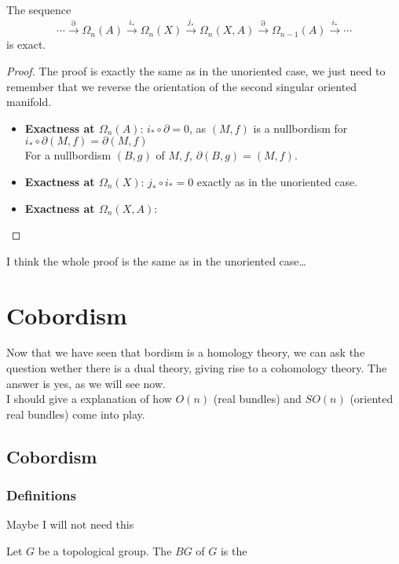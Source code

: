 \documentclass[a4paper,11pt]{article}
\begin{document}
\begin{lemma}
    The sequence
    \[\cdots\xrightarrow{\partial}\Omega_n(A)\xrightarrow{i_\ast}\Omega_n(X)\xrightarrow{j_\ast}\Omega_n(X,A)\xrightarrow{\partial}\Omega_{n-1}(A)\xrightarrow{i_\ast}\cdots\]
    is exact.
\end{lemma}

\begin{proof}
    The proof is exactly the same as in the unoriented case, we just need to remember that we reverse the orientation of the second singular oriented manifold.
    \begin{itemize}
        \item \textbf{Exactness at \(\Omega_n(A)\)}: \(i_\ast\circ\partial=0\), as \((M,f)\) is a nullbordism for \(i_\ast\circ\partial(M,f)=\partial(M,f)\)\\
        For a nullbordism \((B,g)\) of \(M,f\), \(\partial(B,g)=(M,f)\).
        \item \textbf{Exactness at \(\Omega_n(X)\)}: 
        \(j_\ast\circ i_\ast=0\) exactly as in the unoriented case.

        \item \textbf{Exactness at \(\Omega_n(X,A)\)}: 
    \end{itemize}
\end{proof}
I think the whole proof is the same as in the unoriented case\dots


\section{Cobordism}
Now that we have seen that bordism is a homology theory, we can ask the question wether there is a dual theory, giving rise to a cohomology theory. The answer is yes, as we will see now.\\
I should give a explanation of how \(O(n)\) (real bundles) and \(SO(n)\) (oriented real bundles) come into play.

\subsection{Cobordism}

\subsubsection{Definitions}

Maybe I will not need this
\begin{definition}
    Let \(G\) be a topological group. The  \(BG\) of \(G\) is the 
\end{definition}
\end{document}
